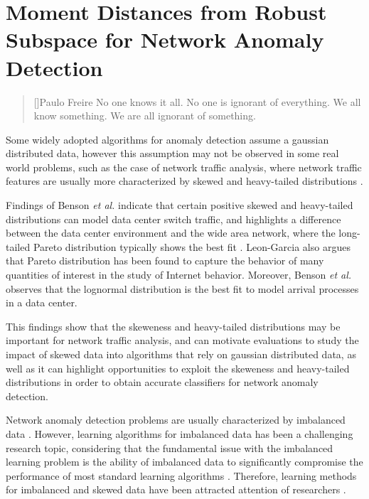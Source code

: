 \chapter{Moment Distances from Robust Subspace for Network Anomaly Detection}
\label{ch:4_m_rpca}

\begin{quotation}[]{Paulo Freire}
No one knows it all. No one is ignorant of everything. We all know something. We are all ignorant of something.
\end{quotation}

Some widely adopted algorithms for anomaly detection assume a gaussian distributed data, however this assumption may not be observed in some real world problems, such as the case of network traffic analysis, where network traffic features are usually more characterized by skewed and heavy-tailed distributions \cite{lakhina2005mining,benson2010network}.

Findings of Benson \emph{et al.}  \cite{benson2010network} indicate that certain positive skewed and heavy-tailed distributions can model data center switch traffic, and highlights a difference between the data center environment and the wide area network, where the long-tailed Pareto distribution typically shows the best fit \cite{benson2010network}. Leon-Garcia \cite{leon2017probability} also argues that Pareto distribution has been found to capture the behavior of many quantities of interest in the study of Internet behavior. Moreover, Benson \emph{et al.}  \cite{benson2010network} observes that the lognormal distribution is the best fit to model arrival processes in a data center.

This findings show that the skeweness and heavy-tailed distributions may be important for network traffic analysis, and can motivate evaluations to study the impact of skewed data into algorithms that rely on gaussian distributed data, as well as it can highlight opportunities to  exploit the skeweness and heavy-tailed distributions in order to obtain accurate classifiers for network anomaly detection. 

Network anomaly detection problems are usually characterized by imbalanced data \cite{Phua2004minority,he2008learning,benson2010network}. However, learning algorithms for imbalanced data has been a challenging research topic, considering that the fundamental issue with the imbalanced learning problem is the ability of imbalanced data to significantly compromise the performance of most standard learning algorithms \cite{he2008learning}. Therefore, learning methods for imbalanced and skewed data have been attracted attention of researchers \cite{Phua2004minority,hubert2009robustskewed}.

